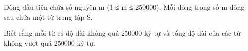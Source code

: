 Dòng đầu tiên chứa số nguyên m (1 ≤ m ≤ 250000). Mỗi dòng trong số m dòng sau chứa một từ trong tập S.  

   Biết rằng mỗi từ có độ dài không quá 250000 ký tự và tổng độ dài của các từ không vượt quá 250000 ký tự.